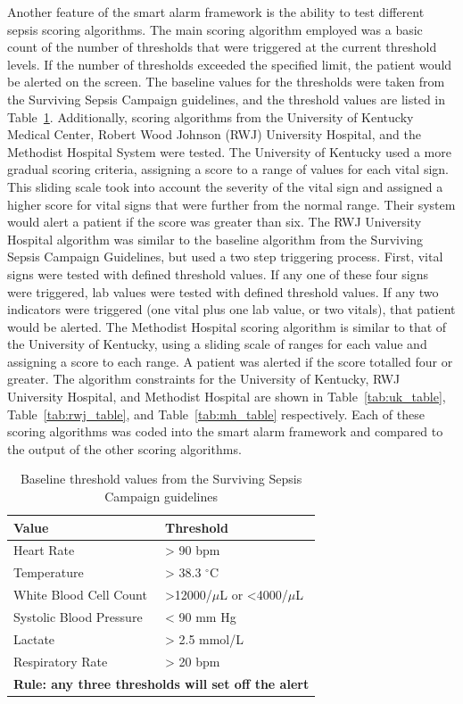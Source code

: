 \documentclass{sig-alternate}
\begin{document}
Another feature of the smart alarm framework is the ability to test different sepsis scoring algorithms.  The main scoring algorithm employed was a basic count of the number of thresholds that were triggered at the current threshold levels.  If the number of thresholds exceeded the specified limit, the patient would be alerted on the screen.  The baseline values for the thresholds were taken from the Surviving Sepsis Campaign guidelines, and the threshold values are listed in Table~\ref{tab:threshold_table}.  
Additionally, scoring algorithms from the University of Kentucky Medical Center, Robert Wood Johnson (RWJ) University Hospital, and the Methodist Hospital System were tested.  The University of Kentucky used a more gradual scoring criteria, assigning a score to a range of values for each vital sign.  This sliding scale took into account the severity of the vital sign and assigned a higher score for vital signs that were further from the normal range.  Their system would alert a patient if the score was greater than six.  The RWJ University Hospital algorithm was similar to the baseline algorithm from the Surviving Sepsis Campaign Guidelines, but used a two step triggering process.  First, vital signs were tested with defined threshold values.  If any one of these four signs were triggered, lab values were tested with defined threshold values.  If any two indicators were triggered (one vital plus one lab value, or two vitals), that patient would be alerted.  The Methodist Hospital scoring algorithm is similar to that of the University of Kentucky, using a sliding scale of ranges for each value and assigning a score to each range.  A patient was alerted if the score totalled four or greater.  The algorithm constraints for the University of Kentucky, RWJ University Hospital, and Methodist Hospital are shown in Table~\ref{tab:uk_table}, Table~\ref{tab:rwj_table}, and Table~\ref{tab:mh_table} respectively.  Each of these scoring algorithms was coded into the smart alarm framework and compared to the output of the other scoring algorithms.

\begin{table}
\renewcommand{\arraystretch}{1.5}
  \begin{tabular}{| l | l |}
\hline

{\bf Value} & {\bf Threshold}\\ \hline
Heart Rate & > 90 bpm\\ \hline
Temperature & > 38.3 $^\circ$C\\ \hline
White Blood Cell Count & >12000/$\mu$L  or <4000/$\mu$L\\ \hline
Systolic Blood Pressure & < 90 mm Hg\\ \hline
Lactate & > 2.5 mmol/L\\ \hline
Respiratory Rate & > 20 bpm\\ \hline
 \multicolumn{2}{|p{7cm}|}{\bf Rule: any three thresholds will set off the alert} \\ \hline
 \end{tabular}
	\caption{Baseline threshold values from the Surviving Sepsis Campaign guidelines}
  \label{tab:threshold_table}
\end{table}
\end{document}
